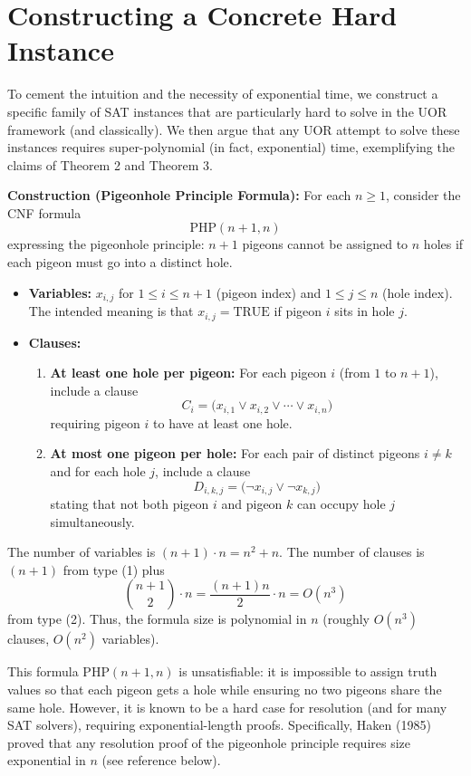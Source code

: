 \documentclass{article}
\begin{document}
\section{Constructing a Concrete Hard Instance}

To cement the intuition and the necessity of exponential time, we construct a specific family of SAT instances that are particularly hard to solve in the UOR framework (and classically). We then argue that any UOR attempt to solve these instances requires super-polynomial (in fact, exponential) time, exemplifying the claims of Theorem 2 and Theorem 3.

\medskip
\textbf{Construction (Pigeonhole Principle Formula):} For each $n\ge 1$, consider the CNF formula
\[
\mathrm{PHP}(n+1,n)
\]
expressing the pigeonhole principle: $n+1$ pigeons cannot be assigned to $n$ holes if each pigeon must go into a distinct hole.
\begin{itemize}
    \item \textbf{Variables:} $x_{i,j}$ for $1 \le i \le n+1$ (pigeon index) and $1 \le j \le n$ (hole index). The intended meaning is that $x_{i,j}=\text{TRUE}$ if pigeon $i$ sits in hole $j$.
    \item \textbf{Clauses:}
    \begin{enumerate}
        \item \textbf{At least one hole per pigeon:} For each pigeon $i$ (from $1$ to $n+1$), include a clause 
        \[
        C_i = \bigl(x_{i,1} \vee x_{i,2} \vee \cdots \vee x_{i,n}\bigr)
        \]
        requiring pigeon $i$ to have at least one hole.
        \item \textbf{At most one pigeon per hole:} For each pair of distinct pigeons $i \neq k$ and for each hole $j$, include a clause 
        \[
        D_{i,k,j} = \bigl(\neg x_{i,j} \vee \neg x_{k,j}\bigr)
        \]
        stating that not both pigeon $i$ and pigeon $k$ can occupy hole $j$ simultaneously.
    \end{enumerate}
\end{itemize}

The number of variables is $(n+1)\cdot n = n^2+n$. The number of clauses is $(n+1)$ from type (1) plus 
\[
\binom{n+1}{2} \cdot n = \frac{(n+1)n}{2}\cdot n = O(n^3)
\]
from type (2). Thus, the formula size is polynomial in $n$ (roughly $O(n^3)$ clauses, $O(n^2)$ variables).

This formula $\mathrm{PHP}(n+1,n)$ is unsatisfiable: it is impossible to assign truth values so that each pigeon gets a hole while ensuring no two pigeons share the same hole. However, it is known to be a hard case for resolution (and for many SAT solvers), requiring exponential-length proofs. Specifically, Haken (1985) proved that any resolution proof of the pigeonhole principle requires size exponential in $n$ (see reference below).
\end{document}
